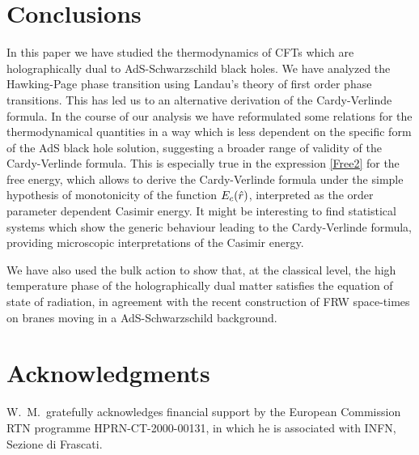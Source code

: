 \documentclass[a4paper,12pt]{article}
\begin{document}
\section{Conclusions}
In this paper we have studied the thermodynamics of CFTs which are
holographically dual to AdS-Schwarzschild black holes. We have analyzed the
Hawking-Page phase transition using  Landau's theory of first order phase
transitions. This has led us to an alternative derivation of the
Cardy-Verlinde formula. In the course of our analysis we have reformulated
some relations for the thermodynamical quantities in a way which is
less dependent on the specific form of the AdS black hole solution,
suggesting a broader range of validity of the  Cardy-Verlinde
formula. This is especially true in the expression \eqref{Free2} for
the free energy, which allows to derive the Cardy-Verlinde formula
under the simple hypothesis of monotonicity of the function
$E_c(\hat{r})$, interpreted as the order parameter dependent Casimir
energy. It might be interesting to find statistical systems which show
the generic behaviour leading to the Cardy-Verlinde formula, providing
microscopic interpretations of the Casimir energy.

We have also used the bulk action to show that, at the classical
level, the high temperature phase of the holographically dual matter
satisfies the equation of state of radiation, in agreement with the recent
construction of FRW space-times on branes moving in a AdS-Schwarzschild
background.

\section*{Acknowledgments}
W.~M.\ gratefully acknowledges financial support by the European
Commission RTN programme HPRN-CT-2000-00131, in which
he is associated with INFN, Sezione di Frascati.
\end{document}
